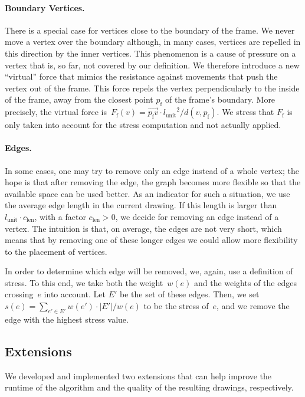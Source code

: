 \documentclass[]{llncs}
\newcommand{\lunit}{\ensuremath{l_\mathrm{unit}}\xspace}
\newcommand{\pframe}{\ensuremath{p_\mathrm{f}}\xspace}
\newcommand{\fframe}{\ensuremath{F_\mathrm{f}}\xspace}
\newcommand{\clen}{\ensuremath{c_\mathrm{len}}\xspace}
\begin{document}
\paragraph{Boundary Vertices.} There is a special case for vertices
close to the boundary of the frame. We never move a vertex over
the boundary although, in many cases, vertices are repelled in this
direction by the inner vertices. This phenomenon is a cause of
pressure on a vertex that is, so far, not covered by our definition.
We therefore introduce a new ``virtual'' force that mimics the
resistance against movements that push the vertex out of the frame.
This force repels the vertex perpendicularly to the inside of the
frame, away from the closest point $\pframe$ of the frame's boundary. More
precisely, the virtual force is~$\fframe(v) =
\overrightarrow{\pframe v} \cdot \lunit^2/d(v,\pframe)$.
We stress that $\fframe$ is only taken into account for the stress
computation and not actually applied.

\paragraph{Edges.}
In some cases, one may try to remove only an edge instead of a whole
vertex; the hope is that after removing the edge, the graph
becomes more flexible so that the available space can be used better.
As an indicator for such a situation, we use the average edge length
in the current drawing. If this length is larger than $\lunit \cdot
\clen$, with a factor $\clen > 0$, we decide for removing an edge
instead of a vertex. The intuition is that, on average, the edges are
not very short, which means that by removing one of these longer edges
we could allow more flexibility to the placement of vertices.

In order to determine which edge will be removed, we, again, use a
definition of stress. To this end, we take both the
weight~$w(e)$ and the weights of the edges crossing~$e$ into account.
Let $E'$ be the set of these edges. Then, we set $s(e) =
\sum_{e' \in E'} w(e') \cdot |E'|/w(e)$ to be the stress
of~$e$, and we remove the edge with the highest stress value.


\subsection{Extensions}
\label{sec:gen-ext}
We developed and implemented two extensions that can help improve the
runtime of the algorithm and the quality of the resulting drawings,
respectively.
\end{document}
